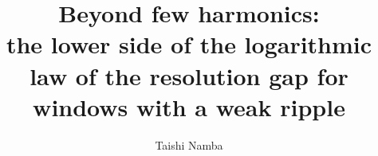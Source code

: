 \documentclass[aps,pre,twocolumn,superscriptaddress,nofootinbib]{revtex4-2}
\begin{document}
\title{\texorpdfstring{Beyond few harmonics:\\ the lower side of the logarithmic law of the resolution gap for windows with a weak ripple}{Beyond few harmonics: the lower side of the logarithmic law of the resolution gap for windows with a weak ripple}}

\author{Taishi Namba}

\begin{abstract}

\end{abstract}

\maketitle












\appendix








\end{document}
